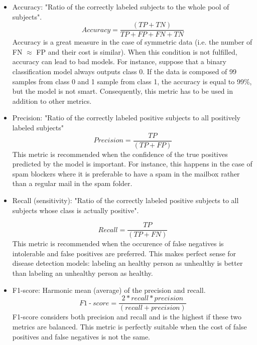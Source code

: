 \begin{itemize}
\item Accuracy: "Ratio of the correctly labeled subjects to the whole pool of subjects".
\begin{equation}
Accuracy = \frac{(TP+TN)}{TP+FP+FN+TN}
\end{equation}
Accuracy is a great measure in the case of symmetric data (i.e. the number of FN $\approx$ FP and their cost is similar). When this condition is not fulfilled, accuracy can lead to bad models. For instance, suppose that a binary classification model always outputs class 0. If the data is composed of 99 samples from class 0 and 1 sample from class 1, the accuracy is equal to 99\%, but the model is not smart. Consequently, this metric has to be used in addition to other metrics.

\item Precision: "Ratio of the correctly labeled positive subjects to all positively labeled subjects"
\begin{equation}
Precision = \frac{TP}{(TP + FP)}
\end{equation}
This metric is recommended when the confidence of the true positives predicted by the model is important. For instance, this happens in the case of spam blockers where it is preferable to have a spam in the mailbox rather than a regular mail in the spam folder.

\item Recall (sensitivity): "Ratio of the correctly labeled positive subjects to all subjects whose class is actually positive".

\begin{equation}
Recall = \frac{TP}{(TP + FN)}
\end{equation}
This metric is recommended when the occurence of false negatives is intolerable and false positives are preferred. This makes perfect sense for disease detection models: labeling an healthy person as unhealthy is better than labeling an unhealthy person as healthy.

\item F1-score: Harmonic mean (average) of the precision and recall.
\begin{equation}
F1\operatorname{-}score = \frac{2* recall * precision}{(recall + precision)}
\end{equation}
F1-score considers both precision and recall and is the highest if these two metrics are balanced. This metric is perfectly suitable when the cost of false positives and false negatives is not the same.


\end{itemize}
